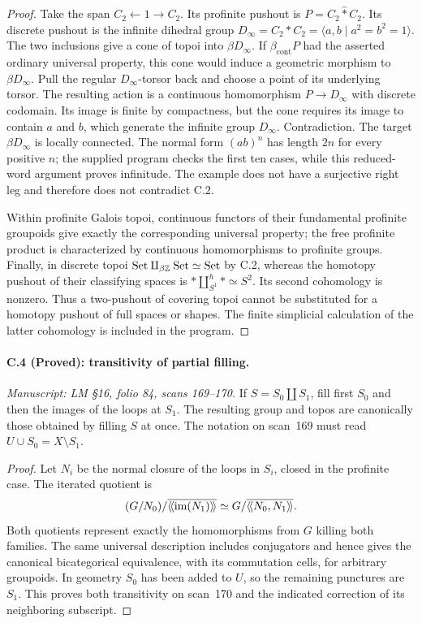 \begin{proof}
Take the span $C_2\leftarrow1\to C_2$. Its profinite
pushout is $P=C_2\widehat * C_2$. Its discrete pushout
is the infinite dihedral group
$D_\infty=C_2*C_2=\langle a,b\mid a^2=b^2=1\rangle$.
The two inclusions give a cone of topoi into
$\beta D_\infty$. If $\beta_{\mathrm{cont}}P$ had
the asserted ordinary universal property, this
cone would induce a geometric morphism to
$\beta D_\infty$. Pull the regular $D_\infty$-torsor
back and choose a point of its underlying torsor.
The resulting action is a continuous homomorphism
$P\to D_\infty$ with discrete codomain. Its image is
finite by compactness, but the cone requires its
image to contain $a$ and $b$, which generate the
infinite group $D_\infty$. Contradiction. The target
$\beta D_\infty$ is locally connected. The normal
form $(ab)^n$ has length $2n$ for every positive $n$;
the supplied program checks the first ten cases,
while this reduced-word argument proves infinitude.
The example does not have a surjective right leg
and therefore does not contradict C.2.

Within profinite Galois topoi, continuous functors
of their fundamental profinite groupoids give
exactly the corresponding universal property;
the free profinite product is characterized by
continuous homomorphisms to profinite groups.
Finally, in discrete topoi
$\mathrm{Set}\amalg_{\beta\mathbb Z}\mathrm{Set}\simeq\mathrm{Set}$ by C.2,
whereas the homotopy pushout of their classifying
spaces is $*\amalg^h_{S^1}*\simeq S^2$.
Its second cohomology is nonzero. Thus a
two-pushout of covering topoi cannot be substituted
for a homotopy pushout of full spaces or shapes.
The finite simplicial calculation of the latter
cohomology is included in the program.
\end{proof}

\paragraph{C.4 (Proved): transitivity of partial filling.}\label{C4}
\textit{Manuscript: LM \S16, folio 84, scans 169--170.}
If $S=S_0\amalg S_1$, fill first $S_0$ and then the
images of the loops at $S_1$. The resulting group
and topos are canonically those obtained by
filling $S$ at once. The notation on scan~169
must read $U\cup S_0=X\setminus S_1$.

\begin{proof}
Let $N_i$ be the normal closure of the loops in
$S_i$, closed in the profinite case. The iterated
quotient is
\[
 (G/N_0)/\overline{\langle\!\langle\mathrm{im}(N_1)\rangle\!\rangle}
 \simeq G/\overline{\langle\!\langle N_0,N_1\rangle\!\rangle}.
\]
Both quotients represent exactly the homomorphisms
from $G$ killing both families. The same universal
description includes conjugators and hence gives
the canonical bicategorical equivalence, with
its commutation cells, for arbitrary groupoids.
In geometry $S_0$ has been added to $U$, so the
remaining punctures are $S_1$. This proves both
transitivity on scan~170 and the indicated
correction of its neighboring subscript.
\end{proof}


